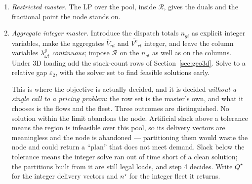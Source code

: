 \begin{enumerate}
\item \emph{Restricted master.} The LP over the pool, inside
  $\mathcal{R}$, gives the duals and the fractional point the node
  stands on.

\item \emph{Aggregate integer master.} Introduce the dispatch totals
  $n_{gt}$ as explicit integer variables, make the aggregates
  $\overline{V}_{nt}$ and $\overline{V^{\mathrm{e}}}_{rt}$ integer,
  and leave the column variables $\lambda^{g}_{\omega t}$
  \emph{continuous}; impose $\mathcal{R}$ on the $n_{gt}$ as well as
  on the columns. Under 3D loading add the stack-count rows of
  Section~\ref{sec:geo3d}. Solve to a relative gap $\varepsilon_{2}$,
  with the solver set to find feasible solutions early.

  This is where the objective is actually decided, and it is decided
  \emph{without a single call to a pricing problem}: the row set is
  the master's own, and what it chooses is the flows and the fleet. Three
  outcomes are distinguished. No solution within the limit abandons the
  node. Artificial slack above a tolerance means the region is
  infeasible over this pool, so its delivery vectors are meaningless and
  the node is abandoned --- partitioning them would waste the node and
  could return a ``plan'' that does not meet demand. Slack below the
  tolerance means the integer solve ran out of time short of a clean
  solution; the partitions built from it are still legal loads, and step
  4 decides. Write $Q^{\star}$ for the integer delivery vectors and
  $n^{\star}$ for the integer fleet it returns.


\end{enumerate}
